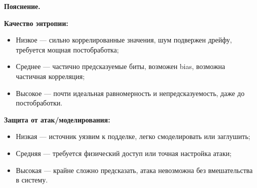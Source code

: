 \begin{landscape}
{\textbf{Пояснение.}

\textbf{Качество энтропии:}
\begin{itemize}\setlength{\itemsep}{0pt}\setlength{\parskip}{0pt}
\item Низкое --- сильно коррелированные значения, шум подвержен дрейфу, требуется мощная постобработка;
\item Среднее --- частично предсказуемые биты, возможен bias, возможна частичная корреляция;
\item Высокое --- почти идеальная равномерность и непредсказуемость, даже до постобработки.
\end{itemize}

\textbf{Защита от атак/моделирования:}
\begin{itemize}\setlength{\itemsep}{0pt}\setlength{\parskip}{0pt}
\item Низкая --- источник уязвим к подделке, легко смоделировать или заглушить;
\item Средняя --- требуется физический доступ или точная настройка атаки;
\item Высокая --- крайне сложно предсказать, атака невозможна без вмешательства в систему.
\end{itemize}
}
\end{landscape}
